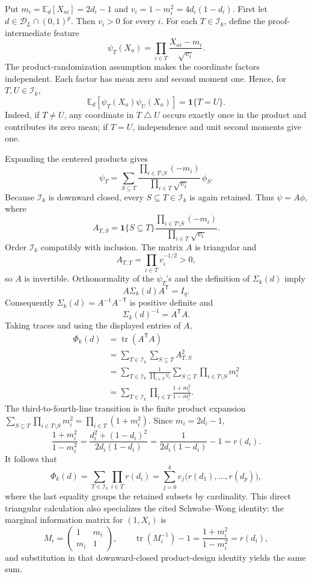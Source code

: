 Put \(m_i=\mathbb E_d[X_{ai}]=2d_i-1\) and \(v_i=1-m_i^2=4d_i(1-d_i)\).  First let \(d\in\mathcal D_L\cap(0,1)^p\).  Then \(v_i>0\) for every \(i\).  For each \(T\in\mathcal I_k\), define the proof-intermediate feature
\[
 \psi_T(X_a)=\prod_{i\in T}\frac{X_{ai}-m_i}{\sqrt{v_i}}.
\]
The product-randomization assumption makes the coordinate factors independent.  Each factor has mean zero and second moment one.  Hence, for \(T,U\in\mathcal I_k\),
\[
 \mathbb E_d[\psi_T(X_a)\psi_U(X_a)]=\mathbf 1\{T=U\}.
\]
Indeed, if \(T\ne U\), any coordinate in \(T\mathbin\triangle U\) occurs exactly once in the product and contributes its zero mean; if \(T=U\), independence and unit second moments give one.

Expanding the centered products gives
\[
 \psi_T
 =\sum_{S\subseteq T}
 \frac{\prod_{i\in T\setminus S}(-m_i)}
      {\prod_{i\in T}\sqrt{v_i}}\,\phi_S.
\]
Because \(\mathcal I_k\) is downward closed, every \(S\subseteq T\in\mathcal I_k\) is again retained.  Thus \(\psi=A\phi\), where
\[
 A_{T,S}=\mathbf 1\{S\subseteq T\}
 \frac{\prod_{i\in T\setminus S}(-m_i)}
      {\prod_{i\in T}\sqrt{v_i}}.
\]
Order \(\mathcal I_k\) compatibly with inclusion.  The matrix \(A\) is triangular and
\[
 A_{T,T}=\prod_{i\in T}v_i^{-1/2}>0,
\]
so \(A\) is invertible.  Orthonormality of the \(\psi_T\)'s and the definition of \(\Sigma_k(d)\) imply
\[
 A\Sigma_k(d)A^{\mathsf T}=I_q.
\]
Consequently \(\Sigma_k(d)=A^{-1}A^{-\mathsf T}\) is positive definite and
\[
 \Sigma_k(d)^{-1}=A^{\mathsf T}A.
\]
Taking traces and using the displayed entries of \(A\),
\[
\begin{aligned}
 \Phi_k(d)
 &=\operatorname{tr}(A^{\mathsf T}A)\\
 &=\sum_{T\in\mathcal I_k}\sum_{S\subseteq T}A_{T,S}^2\\
 &=\sum_{T\in\mathcal I_k}
   \frac{1}{\prod_{i\in T}v_i}
   \sum_{S\subseteq T}\prod_{i\in T\setminus S}m_i^2\\
 &=\sum_{T\in\mathcal I_k}
   \prod_{i\in T}\frac{1+m_i^2}{1-m_i^2}.
\end{aligned}
\]
The third-to-fourth-line transition is the finite product expansion
\(\sum_{S\subseteq T}\prod_{i\in T\setminus S}m_i^2
=\prod_{i\in T}(1+m_i^2)\).  Since \(m_i=2d_i-1\),
\[
 \frac{1+m_i^2}{1-m_i^2}
 =\frac{d_i^2+(1-d_i)^2}{2d_i(1-d_i)}
 =\frac{1}{2d_i(1-d_i)}-1
 =r(d_i).
\]
It follows that
\[
 \Phi_k(d)=\sum_{T\in\mathcal I_k}\prod_{i\in T}r(d_i)
 =\sum_{j=0}^{k}e_j\bigl(r(d_1),\ldots,r(d_p)\bigr),
\]
where the last equality groups the retained subsets by cardinality.  This direct triangular calculation also specializes the cited Schwabe--Wong identity: the marginal information matrix for \((1,X_i)\) is
\[
 M_i=\begin{pmatrix}1&m_i\\m_i&1\end{pmatrix},
 \qquad
 \operatorname{tr}(M_i^{-1})-1
 =\frac{1+m_i^2}{1-m_i^2}=r(d_i),
\]
and substitution in that downward-closed product-design identity yields the same sum.

